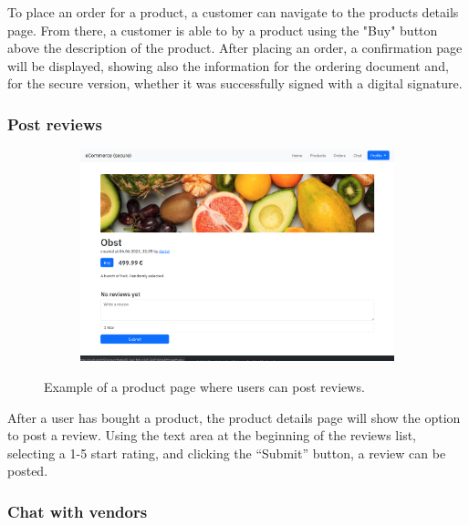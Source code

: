 \documentclass[conference,onecolumn,a4paper]{IEEEtran}
\begin{document}
To place an order for a product, a customer can navigate to the products details page. From there, a customer is able to by a product using the "Buy" button above the description of the product. After placing an order, a confirmation page will be displayed, showing also the information for the ordering document and, for the secure version, whether it was successfully signed with a digital signature.

\subsubsection{Post reviews}

\begin{figure}[H]
    \centering
    \begin{subfigure}[b]{0.4\linewidth}
        \includegraphics[width=\linewidth]{resources/product-customer.png}
    \end{subfigure}
    \caption{Example of a product page where users can post reviews.}
\end{figure}

After a user has bought a product, the product details page will show the option to post a review. Using the text area at the beginning of the reviews list, selecting a 1-5 start rating, and clicking the “Submit” button, a review can be posted.

\subsubsection{Chat with vendors}
\end{document}
